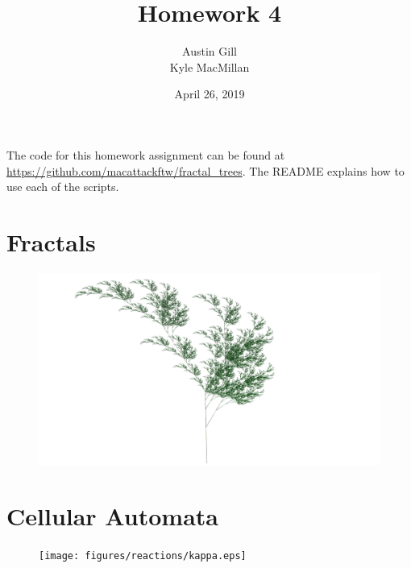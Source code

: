 \documentclass[12pt]{article}
\title{Homework 4}
\author{Austin Gill \\ Kyle MacMillan}
\date{April 26, 2019}
\begin{document}
\maketitle
\begingroup
\hypersetup{linkcolor=black}
\tableofcontents
\listoftodos
\endgroup

The code for this homework assignment can be found at \url{https://github.com/macattackftw/fractal_trees}.
The README explains how to use each of the scripts.

\newpage

\part{Fractals}
\vfill
\begin{figure}[H]
    \centering
    \includegraphics[width=\textwidth]{figures/L-systems/a.png}
\end{figure}




\part{Cellular Automata}
\begin{figure}[H]
    \centering
    \texttt{[image: figures/reactions/kappa.eps]}
\end{figure}


\end{document}
